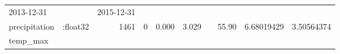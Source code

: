 \documentclass[]{article}
\begin{document}
\begin{longtable}[]{@{}llrrllllrr@{}}
\begin{minipage}[t]{0.07\columnwidth}
2013-12-31\strut
\end{minipage} & \begin{minipage}[t]{0.04\columnwidth}\raggedright\strut
\strut
\end{minipage} & \begin{minipage}[t]{0.07\columnwidth}\raggedright\strut
2015-12-31\strut
\end{minipage} & \begin{minipage}[t]{0.11\columnwidth}\raggedleft\strut
\strut
\end{minipage} & \begin{minipage}[t]{0.07\columnwidth}\raggedleft\strut
\strut
\end{minipage}\tabularnewline
\begin{minipage}[t]{0.08\columnwidth}\raggedright\strut
precipitation\strut
\end{minipage} & \begin{minipage}[t]{0.11\columnwidth}\raggedright\strut
:float32\strut
\end{minipage} & \begin{minipage}[t]{0.06\columnwidth}\raggedleft\strut
1461\strut
\end{minipage} & \begin{minipage}[t]{0.07\columnwidth}\raggedleft\strut
0\strut
\end{minipage} & \begin{minipage}[t]{0.07\columnwidth}\raggedright\strut
0.000\strut
\end{minipage} & \begin{minipage}[t]{0.07\columnwidth}\raggedright\strut
3.029\strut
\end{minipage} & \begin{minipage}[t]{0.04\columnwidth}\raggedright\strut
\strut
\end{minipage} & \begin{minipage}[t]{0.07\columnwidth}\raggedright\strut
55.90\strut
\end{minipage} & \begin{minipage}[t]{0.11\columnwidth}\raggedleft\strut
6.68019429\strut
\end{minipage} & \begin{minipage}[t]{0.07\columnwidth}\raggedleft\strut
3.50564374\strut
\end{minipage}\tabularnewline
\begin{minipage}[t]{0.08\columnwidth}\raggedright\strut
temp\_max\strut
\end{minipage} & \begin{minipage}[t]{0.11\columnwidth}\raggedright\strut

\end{minipage}
\end{longtable}
\end{document}
